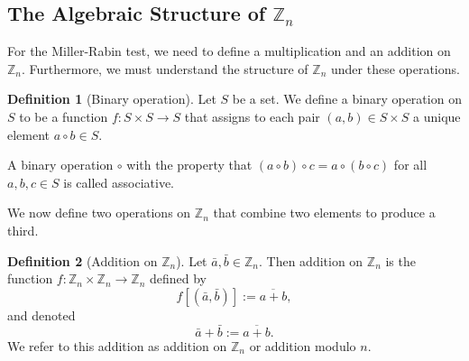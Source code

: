 \documentclass[10pt, titlepage]{amsart}
\newcommand\Z{{\mathbb Z}}
\theoremstyle{definition}
\newtheorem{definition}{Definition}[subsection]
\begin{document}
	
	\subsection{The Algebraic Structure of $\Z_n$}
	
	For the Miller-Rabin test, we need to define a multiplication and an addition on $\Z_n$. Furthermore, we must understand the structure of $\Z_n$ under these operations. 
	
	
	\begin{definition}[Binary operation]\label{definition:bianry operation}
		Let $S$ be a set. We define a binary operation on $S$ to be a function $f:S \times S \to S$ that assigns to each pair $(a,b) \in S \times S$ a unique element $a \circ b \in S$.
		
		A binary operation $\circ$ with the property that $(a \circ b) \circ c = a \circ (b \circ c)$ for all $a, b, c \in S$ is called associative.
	\end{definition}
	
	

	We now define two operations on $\Z_n$ that combine two elements to produce a third.
	\begin{definition}[Addition on $\Z_n$]\label{definition:addition on Zn}
		Let $\bar{a}, \bar{b} \in \Z_n$.
		Then addition on $\Z_n$ is the function $f: \Z_n \times \Z_n \to \Z_n$ defined by $$f[(\bar{a}, \bar{b})] := \overline{a + b},$$
		and denoted $$ \bar{a} + \bar{b} := \overline{a + b}.$$
		We refer to this addition as addition on $\Z_n$ or addition modulo $n$.
	\end{definition}
	
\end{document}

